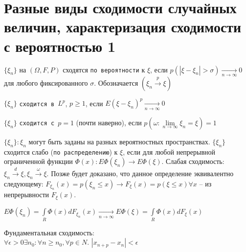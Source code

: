 \section{Разные виды сходимости случайных величин, характеризация сходимости с вероятностью 1}
$\{\xi_{n} \}$ на $(\Omega, F, P)$ сходятся \texttt{по вероятности} к $\xi$, если $p(|\xi - \xi_{n}|>\sigma )\xrightarrow[n\rightarrow \infty]{} 0$ для любого фиксированного $\sigma$. Обозначается $(\xi_n\xrightarrow{p}\xi)$

$\{\xi_{n} \}$ \texttt{сходится в $L^{p}$}, $p \geqslant 1$, если $E(\xi - \xi_{n})^p \xrightarrow[n \rightarrow \infty]{} 0$

$\{\xi_{n} \}$ \texttt{сходится с $p=1$} (почти наверно), если $p(\omega : \lim\limits_{n \rightarrow \infty}\xi_{n} = \xi) = 1$

$\{\xi_{n} \}: \xi_{n}$ могут быть заданы на разных вероятностных пространствах. $\{\xi_{n}\}$  сходится слабо (\texttt{по распределению}) к $\xi$, если для любой непрерывной ограниченной функции $\Phi(x) : E\Phi(\xi_{n}) \rightarrow E\Phi(\xi)$. Слабая сходимость: $\xi_{n} \xrightarrow{d}\xi, \xi_{n} \xrightarrow{\omega}\xi$. Позже будет доказано, что данное определение эквивалентно следующему: $F_{\xi_{n}}(x) = p(\xi_{n}\leqslant x) \rightarrow F_{\xi}(x) = p(\xi \leqslant x) \forall x$ -- из непрерывности $F_{\xi}(x)$.

$E\Phi (\xi_{n}) = \int\limits_{R}^{}\Phi (x)dF_{\xi_{n}}(x) \xrightarrow[n\rightarrow \infty]{}E\Phi(\xi) = \int\limits_{R}^{}\Phi(x)dF_{\xi}(x)$

Фундаментальная сходимость:\\
$\forall \epsilon >0 \exists n_{0}: \forall n \geqslant n_{0}, \forall p \in N$.  $|x_{n+p}-x_{n}|<\epsilon$

